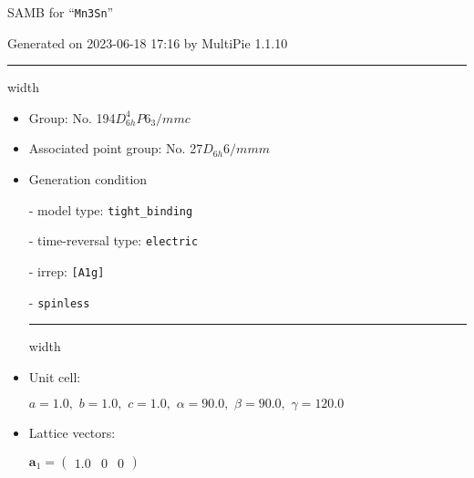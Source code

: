 \documentclass[fleqn,10pt,landscape]{article}
\begin{document}
\setcounter{MaxMatrixCols}{16}

\setlength{\baselineskip}{16pt}
\footnotesize
\begin{center}
\LARGE
SAMB for ``\texttt{Mn3Sn}''
\end{center}
\begin{flushright}
Generated on 2023-06-18 17:16 by MultiPie 1.1.10
\end{flushright}
\vspace{1cm}


 \hfil \hrule height 1mm width \textwidth \hfil

\begin{itemize}
\item Group: No. 194\quad$D_{6h}^{4}$\quad$P6_3/mmc$\quad[ hexagonal ]

\item Associated point group: No. 27\quad$D_{6h}$\quad$6/mmm$\quad[ hexagonal ]

\vspace{5mm}

\item Generation condition

\quad - model type: \texttt{tight_binding}

\quad - time-reversal type: \texttt{electric}

\quad - irrep: \texttt{[A1g]}

\quad - \texttt{spinless}


 \hfil \hrule height 1mm width \textwidth \hfil

\item Unit cell:

\quad $a=1.0,\,\, b=1.0,\,\, c=1.0,\,\, \alpha=90.0,\,\, \beta=90.0,\,\, \gamma=120.0$

\item Lattice vectors:

\quad $\bm{a}_1=\begin{pmatrix} 1.0 & 0 & 0 \end{pmatrix}$


\end{itemize}
\end{document}
